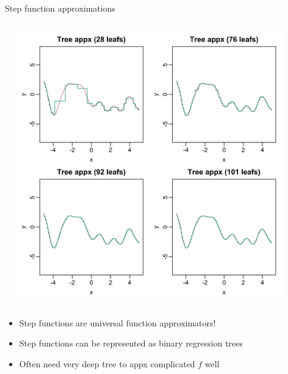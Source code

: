 \documentclass[aspectratio=199]{beamer}
\begin{document}
\begin{frame}{Step function approximations}
\begin{columns}
\begin{column}{0.25\textwidth}
\end{column}
\begin{column}{0.4\textwidth}
\centering
\includegraphics[width = 0.9\textwidth]{figures/tree_appx}
\end{column}
\end{columns}

\begin{itemize}
\item{Step functions are universal function approximators!}

\item{Step functions can be represented as binary regression trees}


\item[\Walley]{Often need very deep tree to appx complicated $f$ well}

\end{itemize}

\end{frame}
\end{document}

